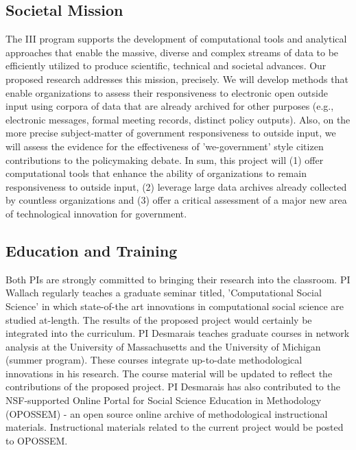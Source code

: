 \subsection{Societal Mission}

The III program supports the development of computational tools and analytical approaches that enable the massive, diverse and complex streams of data to be efficiently utilized to produce scientific, technical and societal advances. Our proposed research addresses this mission, precisely. We will develop methods that enable organizations to assess their responsiveness to electronic open outside input using corpora of data that are already archived for other purposes (e.g., electronic messages, formal meeting records, distinct policy outputs). Also, on the more precise subject-matter of government responsiveness to outside input, we will assess the evidence for the effectiveness of 'we-government' style citizen contributions to the policymaking debate. In sum, this project will (1) offer computational tools that enhance the ability of organizations to remain responsiveness to outside input, (2) leverage large data archives already collected by countless organizations and (3) offer a critical assessment of a major new area of technological innovation for government. 

\subsection{Education and Training}

Both PIs are strongly committed to bringing their research into the classroom. PI Wallach regularly teaches a graduate seminar titled, 'Computational Social Science' in which state-of-the art innovations in computational social science are studied at-length. The results of the proposed project would certainly be integrated into the curriculum. PI Desmarais teaches graduate courses in network analysis at the University of Massachusetts and the University of Michigan (summer program). These courses integrate up-to-date methodological innovations in his research. The course material will be updated to reflect the contributions of the proposed project. PI Desmarais has also contributed to the NSF-supported Online Portal for Social Science Education in Methodology (OPOSSEM) - an open source online archive of methodological instructional materials. Instructional materials related to the current project would be posted to OPOSSEM.


